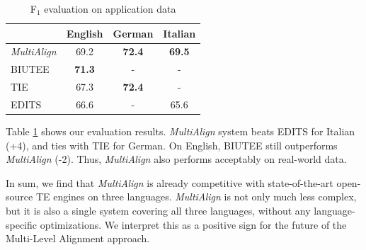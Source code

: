 \documentclass[11pt,letterpaper]{article}
\begin{document}

\begin{table}[t!]
\centering
\begin{tabular}{l|ccc}
              &   English         &   German        &  Italian  \\
\hline
{\em MultiAlign}&   69.2          &  \textbf{72.4}  &  \textbf{69.5}   \\
BIUTEE          &   \textbf{71.3} &     -           &     -            \\
TIE             &     67.3        &  \textbf{72.4}  &     -            \\ 
EDITS           &     66.6        &     -           &    65.6          \\

\end{tabular}
\caption{F$_1$ evaluation on application data}
\label{table:egraph}
\end{table}

Table \ref{table:egraph} shows our evaluation results.
{\it MultiAlign} system beats EDITS for Italian (+4), and ties
with TIE for German. On English, BIUTEE still outperforms {\it
  MultiAlign} (-2). Thus, {\it MultiAlign} also performs acceptably 
on real-world data. 

In sum, we find that {\it MultiAlign} is already competitive with
state-of-the-art open-source TE engines on three languages.  
{\it MultiAlign} is not only much less complex, but it is also a single
system covering all three languages, without any language-specific
optimizations. We interpret this as a positive sign for the future of
the Multi-Level Alignment approach.
\end{document}
